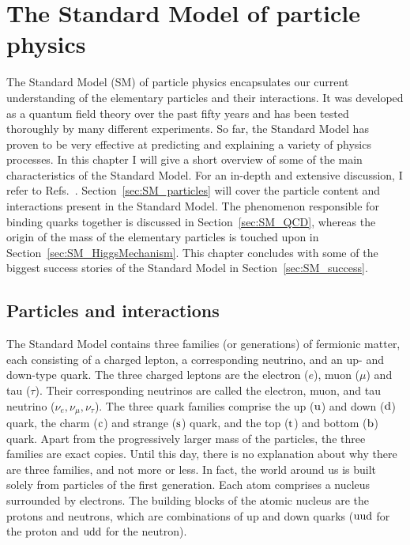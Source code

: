 \chapter{The Standard Model of particle physics \label{chap:standard_model}}

The Standard Model (SM) of particle physics encapsulates our current understanding of the elementary
particles and their interactions. 
It was developed as a quantum field theory over the past fifty years and has been tested thoroughly
by many different experiments. So far, the Standard Model has proven to be very effective at
predicting and explaining a variety of physics processes. 
In this chapter I will give a short overview of some of the main characteristics of the Standard
Model. For an in-depth and extensive discussion, I refer to
Refs.~\cite{Povh:1995mua,bettini2014introduction,Peskin:1995ev,Burgess:2007zi,Agashe:2014kda}.
Section~\ref{sec:SM_particles} will cover the particle content and interactions
present in the Standard Model. 
The phenomenon responsible for binding quarks together is discussed in Section~\ref{sec:SM_QCD},
whereas the origin of the mass of the elementary particles is touched upon in
Section~\ref{sec:SM_HiggsMechanism}. 
This chapter concludes with some of the biggest success stories of the Standard Model in
Section~\ref{sec:SM_success}.

\section{Particles and interactions \label{sec:SM_particles}}

The Standard Model contains three families (or generations) of fermionic matter, each consisting of
a charged lepton, a corresponding neutrino, and an up- and down-type quark.
The three charged leptons are the electron ($e$), muon ($\mu$) and tau ($\tau$). Their corresponding
neutrinos are called the electron, muon, and tau neutrino ($\nu_e, \nu_\mu, \nu_\tau$). 
The three quark families comprise the up ($\mathrm{u}$) and down ($\mathrm{d}$) quark, the charm
($\mathrm{c}$) and strange ($\mathrm{s}$) quark, and the top ($\mathrm{t}$) and bottom ($\mathrm{b}$) quark.
Apart from the progressively larger mass of the particles, the three families are exact copies.
Until this day, there is no explanation about why there are three families, and not more or less. 
In fact, the world around us is built solely from particles of the first generation. 
Each atom comprises a nucleus surrounded by electrons. 
The building blocks of the atomic nucleus are the protons and neutrons, which are combinations of up
and down quarks ($\mathrm{u}\mathrm{u}\mathrm{d}$ for the proton and $\mathrm{u}\mathrm{d}\mathrm{d}$ for the neutron).

